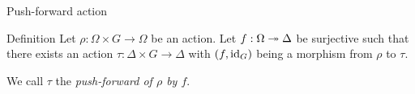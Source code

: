 \documentclass{beamer}
\theoremstyle{plain}
\theoremstyle{definition}
\newcommand{\todo}[1]{{\color{red}*** #1 ***}}
\begin{document}
\begin{frame}{Push-forward action}
\begin{block}{Definition}
Let $\rho : \Omega \times G \to \Omega$ be an action.
Let $f : \Omega \twoheadrightarrow \Delta$ be surjective such that there exists
an action $\tau : \Delta \times G \to \Delta$ with
$(f, \operatorname{id}_G)$ being a morphism from $\rho$ to $\tau$.

We call $\tau$ the \emph{push-forward of $\rho$ by $f$}.
\end{block}
\end{frame}

%
%
%
%

\end{document}
